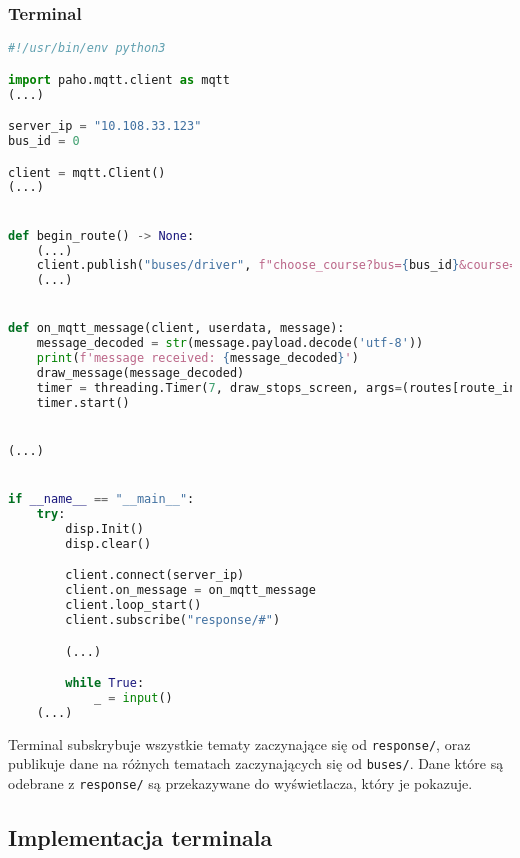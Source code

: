 \subsubsection{Terminal}
\begin{lstlisting}[language={Python}, caption={Terminal, Lokalizacja: \texttt{client/client.py}}]
#!/usr/bin/env python3

import paho.mqtt.client as mqtt
(...)

server_ip = "10.108.33.123"
bus_id = 0

client = mqtt.Client()
(...)


def begin_route() -> None:
    (...)
    client.publish("buses/driver", f"choose_course?bus={bus_id}&course={routes[route_index].name}")
    (...)


def on_mqtt_message(client, userdata, message):
    message_decoded = str(message.payload.decode('utf-8'))
    print(f'message received: {message_decoded}')
    draw_message(message_decoded)
    timer = threading.Timer(7, draw_stops_screen, args=(routes[route_index], current_stop_index))
    timer.start()


(...)


if __name__ == "__main__":
    try:
        disp.Init()
        disp.clear()

        client.connect(server_ip)
        client.on_message = on_mqtt_message
        client.loop_start()
        client.subscribe("response/#")

        (...)

        while True:
            _ = input()
    (...)
\end{lstlisting}
Terminal subskrybuje wszystkie tematy zaczynające się od \verb|response/|, oraz publikuje dane na różnych tematach zaczynających się od \verb|buses/|. Dane które są odebrane z \verb|response/| są przekazywane do wyświetlacza, który je pokazuje.
\subsection{Implementacja terminala}
